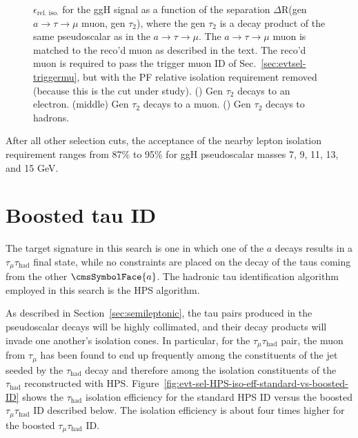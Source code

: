 \begin{figure}[hbtp]
\begin{center}
    \caption{$\epsilon_{\text{rel. iso.}}$ for the ggH signal as a function of the separation $\Delta$R(gen $a\rightarrow\tau\rightarrow\mu$ muon, gen $\tau_{\text{2}}$), where the gen $\tau_{\text{2}}$ is a decay product of the same pseudoscalar as in the $a\rightarrow\tau\rightarrow\mu$.  The $a\rightarrow\tau\rightarrow\mu$ muon is matched to the reco'd muon as described in the text.  The reco'd muon is required to pass the trigger muon ID of Sec.~\ref{sec:evtsel-triggermu}, but with the PF relative isolation requirement removed (because this is the cut under study).  (\cmsLeft) Gen $\tau_{\text{2}}$ decays to an electron.  (middle) Gen $\tau_{\text{2}}$ decays to a muon.  (\cmsRight) Gen $\tau_{\text{2}}$ decays to hadrons.}
    \label{fig:IsoEffVsDR_withFilters}
  \end{center}
\end{figure}

After all other selection cuts, the acceptance of the nearby lepton isolation requirement ranges from 87\% to 95\% for ggH pseudoscalar masses 7, 9, 11, 13, and 15 GeV.

\section{Boosted tau ID\label{sec:evtsel-ditau}}

The target signature in this search is one in which one of the $a$ decays results in a $\tau_{\mu}\tau_{\text{had}}$ final state, while no constraints are placed on the decay of the taus coming from the other $\cmsSymbolFace{a}$. The hadronic tau identification algorithm employed in this search is the HPS algorithm.

As described in Section~\ref{sec:semileptonic}, the tau pairs produced in the pseudoscalar decays will be highly collimated, and their decay products will invade one another's isolation cones. In particular, for the $\tau_{\mu}\tau_{\text{had}}$ pair, the muon from $\tau_{\mu}$ has been found to end up frequently among the constituents of the jet seeded by the $\tau_{\text{had}}$ decay and therefore among the isolation constituents of the $\tau_{\text{had}}$ reconstructed with HPS.  Figure~\ref{fig:evt-sel-HPS-iso-eff-standard-vs-boosted-ID} shows the $\tau_{\text{had}}$ isolation efficiency for the standard HPS ID versus the boosted $\tau_{\mu}\tau_{\text{had}}$ ID described below.  The isolation efficiency is about four times higher for the boosted $\tau_{\mu}\tau_{\text{had}}$ ID.

